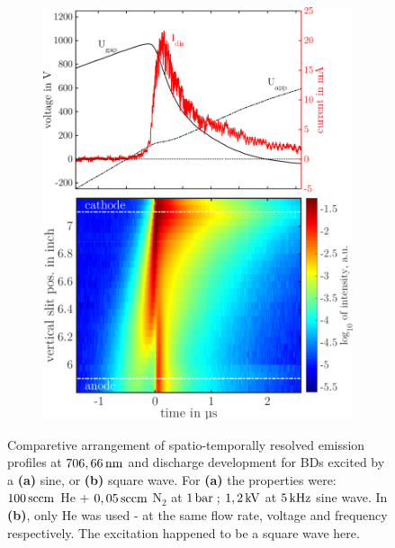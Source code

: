 \documentclass[a4paper,10pt,twoside]{article}
\newcommand{\fett}[1]{\textbf{#1}}
\begin{document}
\begin{figure}
\begin{subfigure}[t]{0.49\textwidth}
						\includegraphics[width=\textwidth]{figures/706nm@square/combination.pdf}
						\caption{}
						\label{img:combsquare}
					\end{subfigure}
					\caption{Comparetive arrangement of spatio-temporally resolved emission profiles at $\unit[706,66]{nm}$ and discharge development for BDs excited by a \fett{(a)} sine, or \fett{(b)} square wave. For \fett{(a)} the properties were: $\unit[100]{sccm}$ He + $\unit[0,05]{sccm}$ N$_2$ at $\unit[1]{bar}$\,; $\unit[1,2]{kV}$ at $\unit[5]{kHz}$ sine wave. In \fett{(b)}, only He was used - at the same flow rate, voltage and frequency respectively. The excitation happened to be a square wave here.}
					\label{img:comparisonsinesquare}
				\end{figure}
				
	\begin{multicols*}{2}
			
	\end{multicols*}
				
\end{document}
